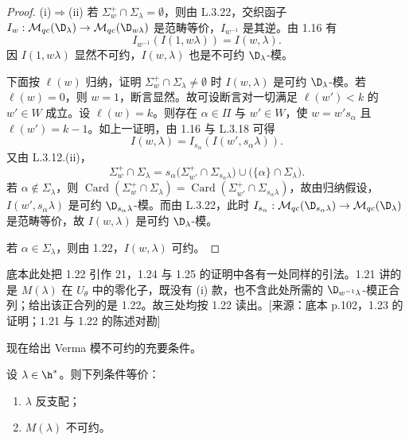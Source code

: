 \begin{proof}
(i)$\Rightarrow$(ii) 若 $\Sigma_w^+\cap\Sigma_\lambda=\emptyset$，则由 L.3.22，交织函子 $I_w:\mathcal{M}_{qc}(\D_\lambda)\to\mathcal{M}_{qc}(\D_{w\lambda})$ 是范畴等价，$I_{w^{-1}}$ 是其逆。由 1.16 有
$$I_{w^{-1}}(I(1,w\lambda))=I(w,\lambda).$$
因 $I(1,w\lambda)$ 显然不可约，$I(w,\lambda)$ 也是不可约 $\D_\lambda$-模。

下面按 $\ell(w)$ 归纳，证明 $\Sigma_w^+\cap\Sigma_\lambda\neq\emptyset$ 时 $I(w,\lambda)$ 是可约 $\D_\lambda$-模。若 $\ell(w)=0$，则 $w=1$，断言显然。故可设断言对一切满足 $\ell(w')<k$ 的 $w'\in W$ 成立。设 $\ell(w)=k$。则存在 $\alpha\in\Pi$ 与 $w'\in W$，使 $w=w's_\alpha$ 且 $\ell(w')=k-1$。如上一证明，由 1.16 与 L.3.18 可得
$$I(w,\lambda)=I_{s_\alpha}(I(w',s_\alpha\lambda)).$$
又由 L.3.12.(ii)，
$$\Sigma_w^+\cap\Sigma_\lambda=s_\alpha\bigl(\Sigma_{w'}^+\cap\Sigma_{s_\alpha\lambda}\bigr)\cup\bigl(\{\alpha\}\cap\Sigma_\lambda\bigr).$$
若 $\alpha\notin\Sigma_\lambda$，则 $\operatorname{Card}(\Sigma_w^+\cap\Sigma_\lambda)=\operatorname{Card}(\Sigma_{w'}^+\cap\Sigma_{s_\alpha\lambda})$，故由归纳假设，$I(w',s_\alpha\lambda)$ 是可约 $\D_{s_\alpha\lambda}$-模。而由 L.3.22，此时 $I_{s_\alpha}:\mathcal{M}_{qc}(\D_{s_\alpha\lambda})\to\mathcal{M}_{qc}(\D_\lambda)$ 是范畴等价，故 $I(w,\lambda)$ 是可约 $\D_\lambda$-模。

若 $\alpha\in\Sigma_\lambda$，则由 1.22，$I(w,\lambda)$ 可约。
\end{proof}
\begin{annote}
底本此处把 1.22 引作 21，1.24 与 1.25 的证明中各有一处同样的引法。1.21 讲的是 $M(\lambda)$ 在 $U_\theta$ 中的零化子，既没有 (i) 款，也不含此处所需的 $\D_{w^{-1}\lambda}$-模正合列；给出该正合列的是 1.22。故三处均按 1.22 读出。[来源：底本 p.102，1.23 的证明；1.21 与 1.22 的陈述对勘]
\end{annote}

现在给出 Verma 模不可约的充要条件。

\begin{theorem}\label{thm:05.1.24}
设 $\lambda\in\h^*$。则下列条件等价：
\begin{enumerate}[label=(\roman*)]
\item $\lambda$ 反支配；
\item $M(\lambda)$ 不可约。
\end{enumerate}
\end{theorem}

